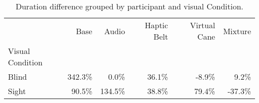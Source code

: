 
\begin{table}[!htb]
\centering
\caption{Duration difference grouped by participant and visual Condition.}
\label{tab:duracao_var_group}
\begin{tabular}{lrrrrr}
\toprule
{} &    Base &   Audio & Haptic Belt & Virtual Cane & Mixture \\
Visual Condition &         &         &             &              &         \\
\midrule
Blind            &  342.3\% &    0.0\% &       36.1\% &        -8.9\% &    9.2\% \\
Sight            &   90.5\% &  134.5\% &       38.8\% &        79.4\% &  -37.3\% \\
\bottomrule
\end{tabular}
\end{table}

